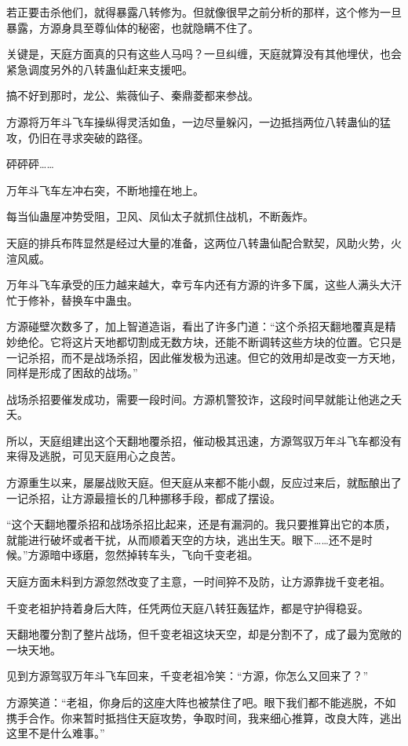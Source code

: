 \begin{this_body}
若正要击杀他们，就得暴露八转修为。但就像很早之前分析的那样，这个修为一旦暴露，方源身具至尊仙体的秘密，也就隐瞒不住了。

关键是，天庭方面真的只有这些人马吗？一旦纠缠，天庭就算没有其他埋伏，也会紧急调度另外的八转蛊仙赶来支援吧。

搞不好到那时，龙公、紫薇仙子、秦鼎菱都来参战。

方源将万年斗飞车操纵得灵活如鱼，一边尽量躲闪，一边抵挡两位八转蛊仙的猛攻，仍旧在寻求突破的路径。

砰砰砰……

万年斗飞车左冲右突，不断地撞在地上。

每当仙蛊屋冲势受阻，卫风、凤仙太子就抓住战机，不断轰炸。

天庭的排兵布阵显然是经过大量的准备，这两位八转蛊仙配合默契，风助火势，火渲风威。

万年斗飞车承受的压力越来越大，幸亏车内还有方源的许多下属，这些人满头大汗忙于修补，替换车中蛊虫。

方源碰壁次数多了，加上智道造诣，看出了许多门道：“这个杀招天翻地覆真是精妙绝伦。它将这片天地都切割成无数方块，还能不断调转这些方块的位置。它只是一记杀招，而不是战场杀招，因此催发极为迅速。但它的效用却是改变一方天地，同样是形成了困敌的战场。”

战场杀招要催发成功，需要一段时间。方源机警狡诈，这段时间早就能让他逃之夭夭。

所以，天庭组建出这个天翻地覆杀招，催动极其迅速，方源驾驭万年斗飞车都没有来得及逃脱，可见天庭用心之良苦。

方源重生以来，屡屡战败天庭。但天庭从来都不能小觑，反应过来后，就酝酿出了一记杀招，让方源最擅长的几种挪移手段，都成了摆设。

“这个天翻地覆杀招和战场杀招比起来，还是有漏洞的。我只要推算出它的本质，就能进行破坏或者干扰，从而顺着天空的方块，逃出生天。眼下……还不是时候。”方源暗中琢磨，忽然掉转车头，飞向千变老祖。

天庭方面未料到方源忽然改变了主意，一时间猝不及防，让方源靠拢千变老祖。

千变老祖护持着身后大阵，任凭两位天庭八转狂轰猛炸，都是守护得稳妥。

天翻地覆分割了整片战场，但千变老祖这块天空，却是分割不了，成了最为宽敞的一块天地。

见到方源驾驭万年斗飞车回来，千变老祖冷笑：“方源，你怎么又回来了？”

方源笑道：“老祖，你身后的这座大阵也被禁住了吧。眼下我们都不能逃脱，不如携手合作。你来暂时抵挡住天庭攻势，争取时间，我来细心推算，改良大阵，逃出这里不是什么难事。”


\end{this_body}
